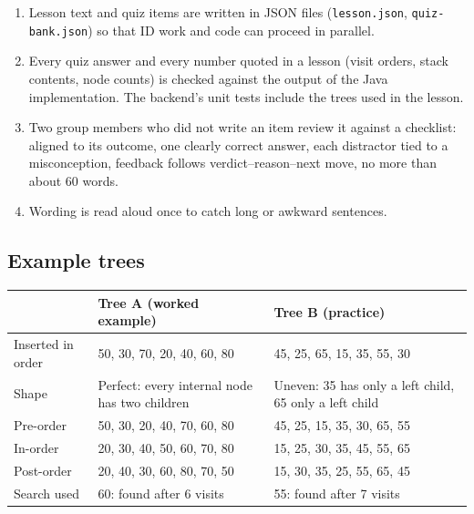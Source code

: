 \documentclass[11pt,a4paper]{article}
\newcommand{\code}[1]{\texttt{#1}}
\begin{document}
\begin{enumerate}
  \item Lesson text and quiz items are written in JSON files (\code{lesson.json},
        \code{quiz-bank.json}) so that ID work and code can proceed in parallel.
  \item Every quiz answer and every number quoted in a lesson (visit orders, stack contents,
        node counts) is checked against the output of the Java implementation. The backend's unit
        tests include the trees used in the lesson.
  \item Two group members who did not write an item review it against a checklist: aligned to its
        outcome, one clearly correct answer, each distractor tied to a misconception, feedback
        follows verdict--reason--next move, no more than about 60 words.
  \item Wording is read aloud once to catch long or awkward sentences.
\end{enumerate}

\subsection{Example trees}

\begin{tabularx}{\textwidth}{@{}l L L@{}}
  \toprule
  & \textbf{Tree A (worked example)} & \textbf{Tree B (practice)} \\
  \midrule
  Inserted in order & 50, 30, 70, 20, 40, 60, 80 & 45, 25, 65, 15, 35, 55, 30 \\
  Shape & Perfect: every internal node has two children & Uneven: 35 has only a left child, 65 only a left child \\
  Pre-order  & 50, 30, 20, 40, 70, 60, 80 & 45, 25, 15, 35, 30, 65, 55 \\
  In-order   & 20, 30, 40, 50, 60, 70, 80 & 15, 25, 30, 35, 45, 55, 65 \\
  Post-order & 20, 40, 30, 60, 80, 70, 50 & 15, 30, 35, 25, 55, 65, 45 \\
  Search used & 60: found after 6 visits & 55: found after 7 visits \\
  \bottomrule
\end{tabularx}
\end{document}
